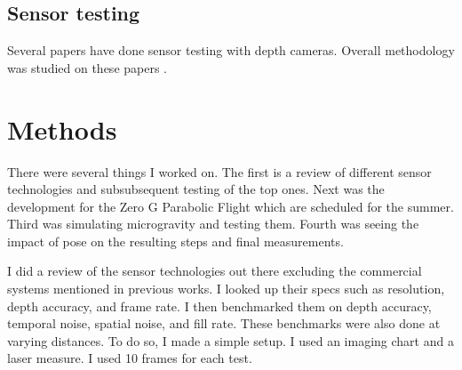 \section{Sensor testing}
Several papers have done sensor testing with depth cameras. Overall methodology was studied on these papers \cite{sophian2017evaluation} \cite{khoshelham2012accuracy} \cite{langmann2012depth} \cite{sankowski2017estimation}.

\chapter{Methods}
There were several things I worked on. The first is a review of different sensor technologies and subsubsequent testing of the top ones. Next was the development for the Zero G Parabolic Flight which are scheduled for the summer. Third was simulating microgravity and testing them. Fourth was seeing the impact of pose on the resulting steps and final measurements.

I did a review of the sensor technologies out there excluding the commercial systems mentioned in previous works. I looked up their specs such as resolution, depth accuracy, and frame rate. I then benchmarked them on depth accuracy, temporal noise, spatial noise, and fill rate. These benchmarks were also done at varying distances. To do so, I made a simple setup. I used an imaging chart and a laser measure. I used 10 frames for each test.

